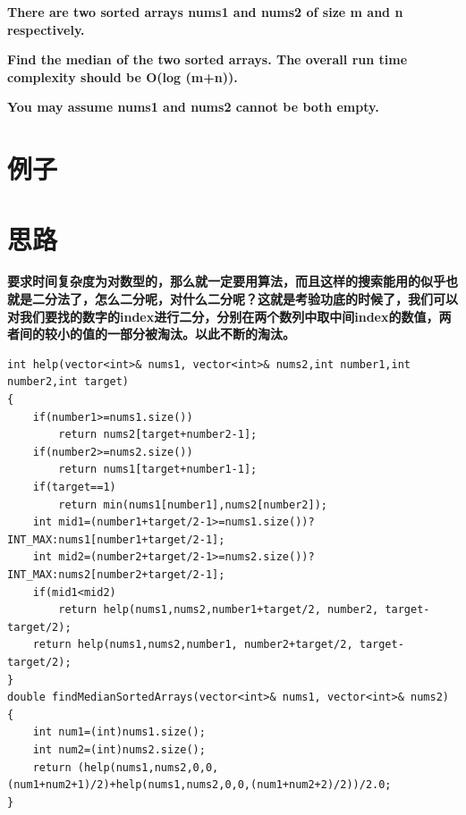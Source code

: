 \documentclass[a4paper, 11pt]{article} %
\begin{document}
\begin{spacing}{1.5}
{{  \textbf{There are two sorted arrays nums1 and nums2 of size m and n respectively.}

  \textbf{Find the median of the two sorted arrays. The overall run time complexity should be O(log (m+n)).}
  
  \textbf{You may assume nums1 and nums2 cannot be both empty.}

  }
  }
  \section*{例子}

\section*{思路}
\textbf{\color{blue}要求时间复杂度为对数型的，那么就一定要用算法，而且这样的搜索能用的似乎也就是二分法了，怎么二分呢，对什么二分呢？这就是考验功底的时候了，我们可以对我们要找的数字的index进行二分，分别在两个数列中取中间index的数值，两者间的较小的值的一部分被淘汰。以此不断的淘汰。}
\begin{lstlisting}[caption={},frame=shadowbox]
int help(vector<int>& nums1, vector<int>& nums2,int number1,int number2,int target)
{
    if(number1>=nums1.size())
        return nums2[target+number2-1];
    if(number2>=nums2.size())
        return nums1[target+number1-1];
    if(target==1)
        return min(nums1[number1],nums2[number2]);
    int mid1=(number1+target/2-1>=nums1.size())?INT_MAX:nums1[number1+target/2-1];
    int mid2=(number2+target/2-1>=nums2.size())?INT_MAX:nums2[number2+target/2-1];
    if(mid1<mid2)
        return help(nums1,nums2,number1+target/2, number2, target-target/2);
    return help(nums1,nums2,number1, number2+target/2, target-target/2);
}
double findMedianSortedArrays(vector<int>& nums1, vector<int>& nums2)
{
    int num1=(int)nums1.size();
    int num2=(int)nums2.size();
    return (help(nums1,nums2,0,0,(num1+num2+1)/2)+help(nums1,nums2,0,0,(num1+num2+2)/2))/2.0;
}
\end{lstlisting}




\end{spacing}
\end{document}
